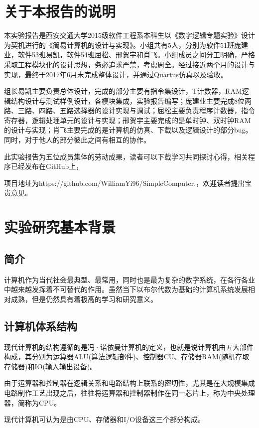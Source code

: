 \documentclass[UTF8]{ctexart}
\begin{document}
    \section{关于本报告的说明}
    本实验报告是西安交通大学2015级软件工程系本科生以《数字逻辑专题实验》设计为契机进行的《简易计算机的设计与实现》。小组共有5人，分别为软件51班庞建业，软件53班易凯，软件54班屈松、邢贺宇和肖飞。小组成员之间分工明确，严格采取工程模块化的设计思想，务必追求严禁，考虑周全。经过接近两个月的设计与实现，最终于2017年6月末完成整体设计，并通过Quartus仿真以及验收。

    组长易凯主要负责总体设计，完成的部分主要有指令集设计，T计数器，RAM逻辑结构设计与测试样例设计，各模块集成，实验报告编写；庞建业主要完成8位两路、三路、四路、五路选择器的设计实现与调试；屈松主要负责程序计数器，指令寄存器，逻辑处理单元的设计与实现；邢贺宇主要完成的是单时钟、双时钟RAM的设计与实现；肖飞主要完成的是计算机的仿真、下载以及逻辑设计的部分bug。同时，对于他人的部分彼此之间有相互的协作。

    此实验报告为五位成员集体的劳动成果，读者可以下载学习共同探讨心得，相关程序已经发布在GitHub上，

    项目地址为https://github.com/WilliamYi96/SimpleComputer.，欢迎读者提出宝贵意见。
    \newpage

    \section{实验研究基本背景}
    \subsection{简介}
    计算机作为当代社会最典型、最常用，同时也是最为复杂的数字系统，在各行各业中越来越发挥着不可替代的作用。虽然当下以布尔代数为基础的计算机系统发展相对成熟，但是仍然具有着极高的学习和研究意义。

    \subsection{计算机体系结构}
    现代计算机的结构遵循的是冯·诺依曼计算机的定义，也就是说计算机由五大部件构成，其分别为运算器ALU(算法逻辑部件)、控制器CU、存储器RAM(随机存取存储器)和IO(输入输出设备)。

    由于运算器和控制器在逻辑关系和电路结构上联系的密切性，尤其是在大规模集成电路制作工艺出现之后，往往将运算器和控制器制作在同一芯片上，称为中央处理器，简称为CPU。

    现代计算机可认为是由CPU、存储器和I/O设备这三个部分构成。
\end{document}
